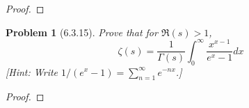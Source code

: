 \documentclass[10pt]{article}
\newcommand{\sk}{\vskip 10mm}
\theoremstyle{plain}
\newtheorem{problem}{Problem}
\theoremstyle{remark}
\begin{document}
\begin{proof}
  
\end{proof}

\sk

\begin{problem}[6.3.15]
  Prove that for $\Re(s)>1$,
  \[
    \zeta(s)=\frac{1}{\Gamma(s)}\int_0^\infty\frac{x^{x-1}}{e^x-1}dx
  \]
  [Hint: Write $1/(e^x-1)=\sum_{n=1}^\infty e^{-nx}$.]
\end{problem}

\begin{proof}
  
\end{proof}

\end{document}
